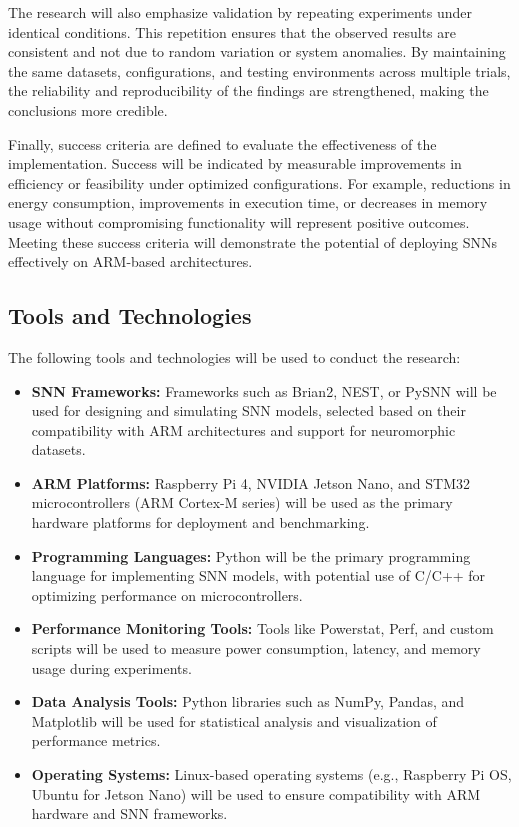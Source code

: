 \documentclass[a4paper,12pt]{article}
\begin{document}
	The research will also emphasize validation by repeating experiments under identical conditions. This repetition ensures that the observed results are consistent and not due to random variation or system anomalies. By maintaining the same datasets, configurations, and testing environments across multiple trials, the reliability and reproducibility of the findings are strengthened, making the conclusions more credible.
	
	Finally, success criteria are defined to evaluate the effectiveness of the implementation. Success will be indicated by measurable improvements in efficiency or feasibility under optimized configurations. For example, reductions in energy consumption, improvements in execution time, or decreases in memory usage without compromising functionality will represent positive outcomes. Meeting these success criteria will demonstrate the potential of deploying SNNs effectively on ARM-based architectures.
	
	\subsection{Tools and Technologies}
	The following tools and technologies will be used to conduct the research:
	\begin{itemize}
		\item \textbf{SNN Frameworks:} Frameworks such as Brian2, NEST, or PySNN will be used for designing and simulating SNN models, selected based on their compatibility with ARM architectures and support for neuromorphic datasets.
		\item \textbf{ARM Platforms:} Raspberry Pi 4, NVIDIA Jetson Nano, and STM32 microcontrollers (ARM Cortex-M series) will be used as the primary hardware platforms for deployment and benchmarking.
		\item \textbf{Programming Languages:} Python will be the primary programming language for implementing SNN models, with potential use of C/C++ for optimizing performance on microcontrollers.
		\item \textbf{Performance Monitoring Tools:} Tools like Powerstat, Perf, and custom scripts will be used to measure power consumption, latency, and memory usage during experiments.
		\item \textbf{Data Analysis Tools:} Python libraries such as NumPy, Pandas, and Matplotlib will be used for statistical analysis and visualization of performance metrics.
		\item \textbf{Operating Systems:} Linux-based operating systems (e.g., Raspberry Pi OS, Ubuntu for Jetson Nano) will be used to ensure compatibility with ARM hardware and SNN frameworks.
	\end{itemize}
	
\end{document}
